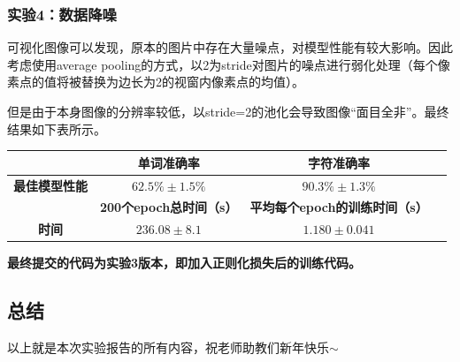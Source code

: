 \documentclass[a4paper,UTF8]{article}
\numberwithin{equation}{section}
\begin{document}
\subsubsection{实验4：数据降噪}
\par 可视化图像可以发现，原本的图片中存在大量噪点，对模型性能有较大影响。因此考虑使用average pooling的方式，以2为stride对图片的噪点进行弱化处理（每个像素点的值将被替换为边长为2的视窗内像素点的均值）。
\par 但是由于本身图像的分辨率较低，以stride=2的池化会导致图像“面目全非”。最终结果如下表所示。
\begin{table}[H]
    \centering
    \begin{tabular}{cccc}
        \hline 
         & \textbf{单词准确率} & \textbf{字符准确率} \\ 
        \hline 
        \textbf{最佳模型性能} & $62.5\% \pm 1.5\%$ & $90.3\%\pm 1.3\%$ \\ 
        \hline
        \hline
        &\textbf{200个epoch总时间（s）}&\textbf{平均每个epoch的训练时间（s）}\\
        \hline
        \textbf{时间} &$236.08\pm 8.1$ & $1.180\pm0.041$\\
        \hline
    \end{tabular}
\end{table}


\par \textbf{最终提交的代码为实验3版本，即加入正则化损失后的训练代码。}

\subsection{总结}
\par 以上就是本次实验报告的所有内容，祝老师助教们新年快乐$\sim$
\end{document}
